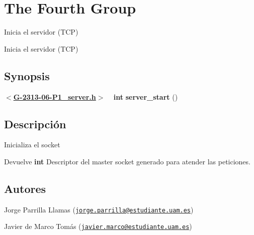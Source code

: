 \hypertarget{group__group4}{}\section{The Fourth Group}
\label{group__group4}


Inicia el servidor (T\+C\+P)  


Inicia el servidor (T\+C\+P) 

\hypertarget{group__group4_Synopsis}{}\subsection{Synopsis}\label{group__group4_Synopsis}
{ {\bfseries $<$\hyperlink{G-2313-06-P1__server_8h_source}{G-\/2313-\/06-\/\+P1\+\_\+server.\+h}$>$} ~\newline
 {\bfseries int} {\bfseries server\+\_\+start} {\bfseries }() } \hypertarget{group__group4_descripcion}{}\subsection{Descripción}\label{group__group4_descripcion}
Inicializa el socket

\begin{DoxyReturn}{Devuelve}
{\bfseries int} Descriptor del master socket generado para atender las peticiones.
\end{DoxyReturn}
\hypertarget{group__group4_authors}{}\subsection{Autores}\label{group__group4_authors}

\begin{DoxyItemize}
\item Jorge Parrilla Llamas (\href{mailto:jorge.parrilla@estudiante.uam.es}{\tt jorge.\+parrilla@estudiante.\+uam.\+es}) 
\item Javier de Marco Tomás (\href{mailto:javier.marco@estudiante.uam.es}{\tt javier.\+marco@estudiante.\+uam.\+es}) 
\end{DoxyItemize}